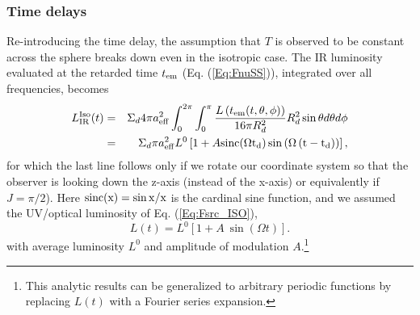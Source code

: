 \subsubsection{Time delays}
Re-introducing the time delay, the assumption that $T$ is observed to be
constant across the sphere breaks down even in the isotropic case. The IR
luminosity evaluated at the retarded time $t_{\em}$ (Eq. (\ref{Eq:FnuSS})),
integrated over all frequencies, becomes
\begin{eqnarray}
L^{\rm{Iso}}_{\rm{IR}}(t)
&=&\Sigma_d 4 \pi a^2_{\eff} \int^{2 \pi}_0{\int^{\pi}_0{  \frac{L\left( t_{\em}(t, \theta, \phi) \right)}{16 \pi R^2_d } R^2_d \sin{\theta} d\theta d\phi }} \nonumber \\
&=&  \Sigma_d \pi  a^2_{\eff} L^0  \left[ 
  1 +  A \rm{sinc}{\left( \Omega t_d \right)}  \sin{ \left( \Omega \left( t - t_d \right) \right)  }
   \right],
   \label{Eq:LIR_sp}
\end{eqnarray}
for which the last line follows only if we rotate our coordinate 
system so that the observer is looking down the z-axis (instead of the x-axis) 
or equivalently if $J= \pi/2$). Here $\rm{sinc}(x) = \sin{x}/x$ is the 
cardinal sine function, and we assumed the UV/optical luminosity of 
Eq. (\ref{Eq:Fsrc_ISO}),
\begin{equation}
L(t) =  L^0  \left[ 
  1 +  A \  \sin{ \left( \Omega t  \right)  }
   \right].
\end{equation}
with average luminosity $L^0$ and amplitude of modulation $A$.\footnote{This
analytic results can be generalized to arbitrary periodic functions by
replacing $L(t)$ with a Fourier series expansion.}

